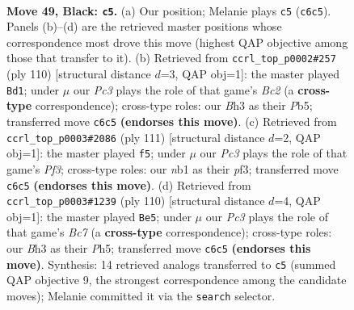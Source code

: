 \documentclass[11pt]{article}
\begin{document}
\clearpage

\begin{figure}[p]\centering
\begin{subfigure}{0.46\textwidth}\centering
\resizebox{\linewidth}{!}{%
\newchessgame
\chessboard[
  setfen={3B4/6k1/p1p5/8/8/7b/5K2/1N6 b - - 2 49},
  showmover=false,
  pgfstyle=straightmove, color=movearrow, markmove={c6-c5}
]}
\caption{}
\end{subfigure}\hfill
\begin{subfigure}{0.46\textwidth}\centering
\resizebox{\linewidth}{!}{%
\newchessgame
\chessboard[
  setfen={8/8/3k4/1P5K/8/4b3/2B1P3/8 w - - 3 56},
  showmover=false,
  pgfstyle=straightmove, color=movearrow, markmove={c2-d1}
]}
\caption{}
\end{subfigure}
\\[4pt]
\begin{subfigure}{0.46\textwidth}\centering
\resizebox{\linewidth}{!}{%
\newchessgame
\chessboard[
  setfen={8/7k/4Bp2/b7/7p/5P2/8/5K2 b - - 5 56},
  showmover=false,
  pgfstyle=straightmove, color=movearrow, markmove={f6-f5}
]}
\caption{}
\end{subfigure}\hfill
\begin{subfigure}{0.46\textwidth}\centering
\resizebox{\linewidth}{!}{%
\newchessgame
\chessboard[
  setfen={8/2B2k2/8/3K2bP/8/7P/8/8 w - - 2 56},
  showmover=false,
  pgfstyle=straightmove, color=movearrow, markmove={c7-e5}
]}
\caption{}
\end{subfigure}
\caption{\textbf{Move 49, Black: \texttt{c5}.} (a) Our position; Melanie plays \texttt{c5} (\texttt{c6c5}). Panels (b)--(d) are the retrieved master positions whose correspondence most drove this move (highest QAP objective among those that transfer to it). (b) Retrieved from \texttt{ccrl\_top\_p0002\#257} (ply 110) [structural distance $d$=3, QAP obj=1]: the master played \texttt{Bd1}; under $\mu$ our \emph{Pc3} plays the role of that game's \emph{Bc2} (a \textbf{cross-type} correspondence); cross-type roles: our \emph{B}h3 as their \emph{P}b5; transferred move \texttt{c6c5} \textbf{(endorses this move)}. (c) Retrieved from \texttt{ccrl\_top\_p0003\#2086} (ply 111) [structural distance $d$=2, QAP obj=1]: the master played \texttt{f5}; under $\mu$ our \emph{Pc3} plays the role of that game's \emph{Pf3}; cross-type roles: our \emph{n}b1 as their \emph{p}f3; transferred move \texttt{c6c5} \textbf{(endorses this move)}. (d) Retrieved from \texttt{ccrl\_top\_p0003\#1239} (ply 110) [structural distance $d$=4, QAP obj=1]: the master played \texttt{Be5}; under $\mu$ our \emph{Pc3} plays the role of that game's \emph{Bc7} (a \textbf{cross-type} correspondence); cross-type roles: our \emph{B}h3 as their \emph{P}h5; transferred move \texttt{c6c5} \textbf{(endorses this move)}. Synthesis: 14 retrieved analogs transferred to \texttt{c5} (summed QAP objective 9, the strongest correspondence among the candidate moves); Melanie committed it via the \texttt{search} selector.}
\label{fig:thought-m97}
\end{figure}
\end{document}
